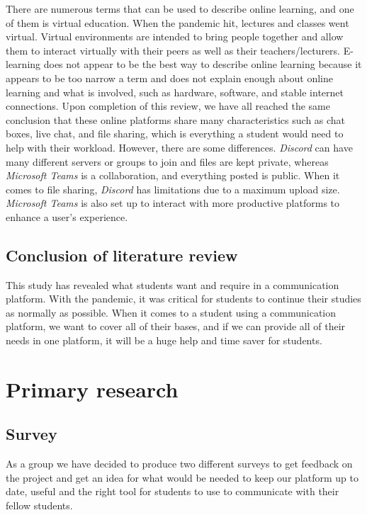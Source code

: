There are numerous terms that can be used to describe online learning, and one of them is virtual education. When the pandemic hit, lectures and classes went virtual. Virtual environments are intended to bring people together and allow them to interact virtually with their peers as well as their teachers/lecturers. E-learning does not appear to be the best way to describe online learning because it appears to be too narrow a term and does not explain enough about online learning and what is involved, such as hardware, software, and stable internet connections.
Upon completion of this review, we have all reached the same conclusion that these online platforms share many characteristics such as chat boxes, live chat, and file sharing, which is everything a student would need to help with their workload. However, there are some differences. \textit{Discord} can have many different servers or groups to join and files are kept private, whereas \textit{Microsoft Teams} is a collaboration, and everything posted is public. When it comes to file sharing, \textit{Discord} has limitations due to a maximum upload size. \textit{Microsoft Teams} is also set up to interact with more productive platforms to enhance a user's experience.

\section{Conclusion of literature review}

This study has revealed what students want and require in a communication platform. With the pandemic, it was critical for students to continue their studies as normally as possible. When it comes to a student using a communication platform, we want to cover all of their bases, and if we can provide all of their needs in one platform, it will be a huge help and time saver for students. 



\chapter{Primary research}

\section{Survey}
As a group we have decided to produce two different surveys to get feedback on the project and get an idea for what would be needed to keep our platform up to date, useful and the right tool for students to use to communicate with their fellow students.\hfill \break

